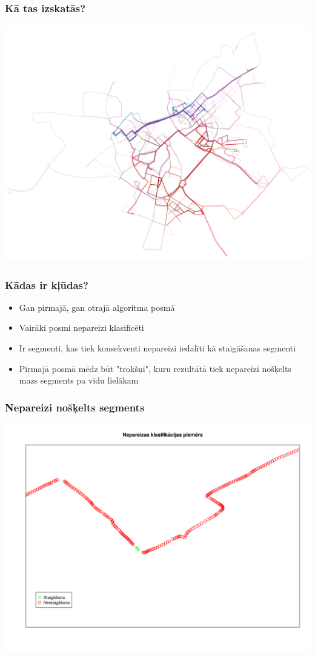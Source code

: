 \documentclass[xelatex,mathserif,serif]{beamer}
\newlength{\wideitemsep}
\let\olditem\item
\renewcommand{\item}{\setlength{\itemsep}{\wideitemsep}\olditem}
\begin{document}
\begin{frame}
  \frametitle{Kā tas izskatās?}
  \includegraphics[scale=0.3]{img/clustered_trails}
\end{frame}

\begin{frame}
  \frametitle{Kādas ir kļūdas?}
  \begin{itemize}
  \item Gan pirmajā, gan otrajā algoritma posmā
  \item Vairāki posmi nepareizi klasificēti
  \item Ir segmenti, kas tiek konsekventi nepareizi iedalīti kā staigāšanas segmenti
  \item Pirmajā posmā mēdz būt "trokšņi", kuru rezultātā tiek nepareizi nošķelts mazs segments 
    pa vidu lielākam
  \end{itemize}
\end{frame}

\begin{frame}
  \frametitle{Nepareizi nošķelts segments}
  \includegraphics[scale=0.3]{img/wrong_segmentation}
\end{frame}
\end{document}
